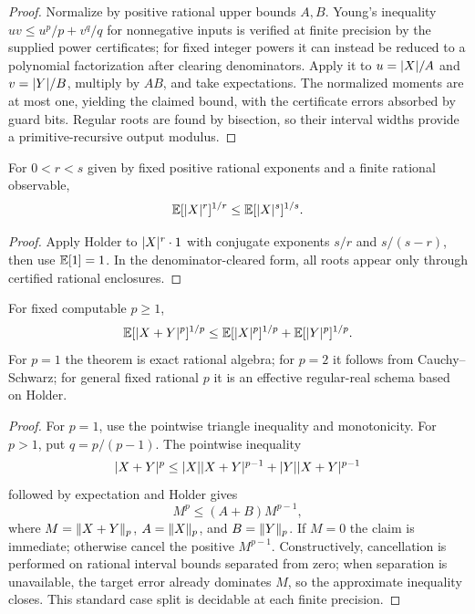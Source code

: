 \begin{proof}
Normalize by positive rational upper bounds \(A,B\).  Young's inequality
\(uv\le u^p/p+v^q/q\) for nonnegative inputs is verified at finite precision by
the supplied power certificates; for fixed integer powers it can instead be
reduced to a polynomial factorization after clearing denominators.  Apply it to
\(u=\lvert X\rvert/A\) and \(v=\lvert Y\rvert/B\), multiply by \(AB\), and take expectations.
The normalized moments are at most one, yielding the claimed bound, with the
certificate errors absorbed by guard bits.  Regular roots are found by
bisection, so their interval widths provide a primitive-recursive output
modulus.
\end{proof}

\begin{corollary}\label{cor:lyapunov}
For \(0<r<s\) given by fixed positive rational exponents and a finite rational
observable,
\[
 \mathbb E[\lvert X\rvert^r]^{1/r}\le\mathbb E[\lvert X\rvert^s]^{1/s}.
\]
\end{corollary}

\begin{proof}
Apply Holder to \(\lvert X\rvert^r\cdot1\) with conjugate exponents
\(s/r\) and \(s/(s-r)\), then use \(\mathbb E[1]=1\).  In the denominator-cleared
form, all roots appear only through certified rational enclosures.
\end{proof}

\begin{theorem}\label{thm:minkowski}
For fixed computable \(p\ge1\),
\[
 \mathbb E[\lvert X+Y\rvert^p]^{1/p}
 \le \mathbb E[\lvert X\rvert^p]^{1/p}+\mathbb E[\lvert Y\rvert^p]^{1/p}.
\]
For \(p=1\) the theorem is exact rational algebra; for \(p=2\) it follows
from Cauchy--Schwarz; for general fixed rational \(p\) it is an effective
regular-real schema based on Holder.
\end{theorem}

\begin{proof}
For \(p=1\), use the pointwise triangle inequality and monotonicity.  For
\(p>1\), put \(q=p/(p-1)\).  The pointwise inequality
\[
 \lvert X+Y\rvert^p
 \le \lvert X\rvert\lvert X+Y\rvert^{p-1}+\lvert Y\rvert\lvert X+Y\rvert^{p-1}
\]
followed by expectation and Holder gives
\[
 M^p\le (A+B)M^{p-1},
\]
where \(M=\lVert X+Y\rVert_p\), \(A=\lVert X\rVert_p\), and \(B=\lVert Y\rVert_p\).
If \(M=0\) the claim is immediate; otherwise cancel the positive
\(M^{p-1}\).  Constructively, cancellation is performed on rational interval
bounds separated from zero; when separation is unavailable, the target error
already dominates \(M\), so the approximate inequality closes.  This standard
case split is decidable at each finite precision.
\end{proof}
